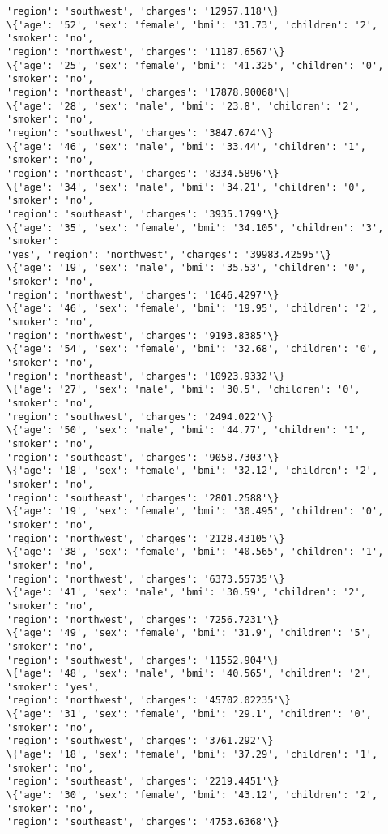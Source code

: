 \documentclass[11pt]{article}
\begin{document}
\begin{Verbatim}[commandchars=\\\{\}]
'region': 'southwest', 'charges': '12957.118'\}
\{'age': '52', 'sex': 'female', 'bmi': '31.73', 'children': '2', 'smoker': 'no',
'region': 'northwest', 'charges': '11187.6567'\}
\{'age': '25', 'sex': 'female', 'bmi': '41.325', 'children': '0', 'smoker': 'no',
'region': 'northeast', 'charges': '17878.90068'\}
\{'age': '28', 'sex': 'male', 'bmi': '23.8', 'children': '2', 'smoker': 'no',
'region': 'southwest', 'charges': '3847.674'\}
\{'age': '46', 'sex': 'male', 'bmi': '33.44', 'children': '1', 'smoker': 'no',
'region': 'northeast', 'charges': '8334.5896'\}
\{'age': '34', 'sex': 'male', 'bmi': '34.21', 'children': '0', 'smoker': 'no',
'region': 'southeast', 'charges': '3935.1799'\}
\{'age': '35', 'sex': 'female', 'bmi': '34.105', 'children': '3', 'smoker':
'yes', 'region': 'northwest', 'charges': '39983.42595'\}
\{'age': '19', 'sex': 'male', 'bmi': '35.53', 'children': '0', 'smoker': 'no',
'region': 'northwest', 'charges': '1646.4297'\}
\{'age': '46', 'sex': 'female', 'bmi': '19.95', 'children': '2', 'smoker': 'no',
'region': 'northwest', 'charges': '9193.8385'\}
\{'age': '54', 'sex': 'female', 'bmi': '32.68', 'children': '0', 'smoker': 'no',
'region': 'northeast', 'charges': '10923.9332'\}
\{'age': '27', 'sex': 'male', 'bmi': '30.5', 'children': '0', 'smoker': 'no',
'region': 'southwest', 'charges': '2494.022'\}
\{'age': '50', 'sex': 'male', 'bmi': '44.77', 'children': '1', 'smoker': 'no',
'region': 'southeast', 'charges': '9058.7303'\}
\{'age': '18', 'sex': 'female', 'bmi': '32.12', 'children': '2', 'smoker': 'no',
'region': 'southeast', 'charges': '2801.2588'\}
\{'age': '19', 'sex': 'female', 'bmi': '30.495', 'children': '0', 'smoker': 'no',
'region': 'northwest', 'charges': '2128.43105'\}
\{'age': '38', 'sex': 'female', 'bmi': '40.565', 'children': '1', 'smoker': 'no',
'region': 'northwest', 'charges': '6373.55735'\}
\{'age': '41', 'sex': 'male', 'bmi': '30.59', 'children': '2', 'smoker': 'no',
'region': 'northwest', 'charges': '7256.7231'\}
\{'age': '49', 'sex': 'female', 'bmi': '31.9', 'children': '5', 'smoker': 'no',
'region': 'southwest', 'charges': '11552.904'\}
\{'age': '48', 'sex': 'male', 'bmi': '40.565', 'children': '2', 'smoker': 'yes',
'region': 'northwest', 'charges': '45702.02235'\}
\{'age': '31', 'sex': 'female', 'bmi': '29.1', 'children': '0', 'smoker': 'no',
'region': 'southwest', 'charges': '3761.292'\}
\{'age': '18', 'sex': 'female', 'bmi': '37.29', 'children': '1', 'smoker': 'no',
'region': 'southeast', 'charges': '2219.4451'\}
\{'age': '30', 'sex': 'female', 'bmi': '43.12', 'children': '2', 'smoker': 'no',
'region': 'southeast', 'charges': '4753.6368'\}

\end{Verbatim}
\end{document}
